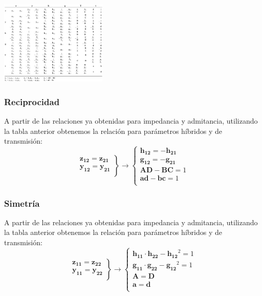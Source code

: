 \includegraphics[height=4cm]{../figs/Tabla_Parametros.pdf}


\subsubsection{Reciprocidad}
\label{sec:org8de0a87}
A partir de las relaciones ya obtenidas para impedancia y admitancia, utilizando la tabla anterior obtenemos la relación para parámetros híbridos y de transmisión:
\[
\left.
\begin{array}{l}
  \mathbf{z_{12}} = \mathbf{z_{21}}\\
  \mathbf{y_{12}} = \mathbf{y_{21}}\\
\end{array}
\right\} \rightarrow
\left\{
\begin{array}{l}
  \mathbf{h_{12}} = - \mathbf{h_{21}}\\
  \mathbf{g_{12}} = - \mathbf{g_{21}}\\
  \mathbf{A} \mathbf{D} - \mathbf{B} \mathbf{C} = 1\\
  \mathbf{a} \mathbf{d} - \mathbf{b} \mathbf{c} = 1\\
\end{array}
\right.
\]


\subsubsection{Simetría}
\label{sec:org32ff848}
A partir de las relaciones ya obtenidas para impedancia y admitancia, utilizando la tabla anterior obtenemos la relación para parámetros híbridos y de transmisión:
\[
\left.
\begin{array}{l}
  \mathbf{z_{11}} = \mathbf{z_{22}}\\
  \mathbf{y_{11}} = \mathbf{y_{22}}\\
\end{array}
\right\} \rightarrow
\left\{
\begin{array}{l}
  \mathbf{h_{11}} \cdot \mathbf{h_{22}} - \mathbf{h_{12}}^2 = 1\\
  \mathbf{g_{11}} \cdot \mathbf{g_{22}} - \mathbf{g_{12}}^2 = 1\\
  \mathbf{A} =  \mathbf{D}\\
  \mathbf{a} =  \mathbf{d}\\
\end{array}
\right.
\]

